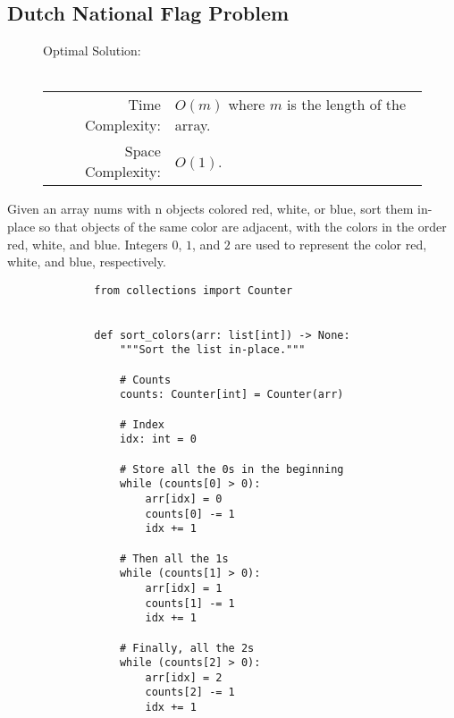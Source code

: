 
\subsection{Dutch National Flag Problem}

\begin{figure}[H]
    Optimal Solution:\\\\
    \begin{tabular}{rl}
        Time Complexity:& \(O(m)\) where \(m\) is the length of the array.\\
        Space Complexity:& \(O(1)\).
    \end{tabular}
\end{figure}

Given an array nums with n objects colored red, white, or blue, sort them
in-place so that objects of the same color are adjacent, with the colors in the
order red, white, and blue. Integers \(0\), \(1\), and \(2\) are used to
represent the color red, white, and blue, respectively.

\begin{figure}[H]
    \centering
    \begin{verbatim}
        from collections import Counter


        def sort_colors(arr: list[int]) -> None:
            """Sort the list in-place."""
        
            # Counts
            counts: Counter[int] = Counter(arr)

            # Index
            idx: int = 0

            # Store all the 0s in the beginning 
            while (counts[0] > 0): 
                arr[idx] = 0
                counts[0] -= 1
                idx += 1

            # Then all the 1s 
            while (counts[1] > 0): 
                arr[idx] = 1
                counts[1] -= 1
                idx += 1

            # Finally, all the 2s 
            while (counts[2] > 0): 
                arr[idx] = 2
                counts[2] -= 1
                idx += 1
    \end{verbatim}
\end{figure}
